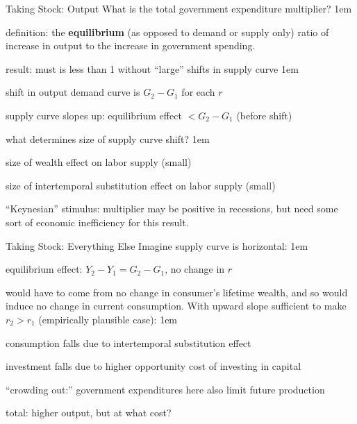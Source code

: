 \documentclass[11pt,aspectratio=43]{beamer}
\let\olditemize=\itemize
\let\endolditemize=\enditemize
\renewenvironment{itemize}{\olditemize \itemsep1em}{\endolditemize}
\theoremstyle{definition}
\begin{document}
\begin{frame}{Taking Stock: Output}
\label{slide:Taking_Stock__Output}
    What is the \alert{total government expenditure multiplier}?
    \begin{itemize}
        \item \alert{definition}: the \textbf{equilibrium} (as opposed to demand or supply only) ratio of increase in output to the increase in government spending.
        \item \alert{result:} must is less than 1 without ``large'' shifts in supply curve
        \begin{itemize}
            \item  shift in output demand curve is $ G_{2} - G_{1} $ for each $ r $
            \item supply curve slopes up: equilibrium effect $ < G_{2} - G_{1} $ (before shift)
            \item what determines size of supply curve shift?
            \begin{itemize}
                \item size of wealth effect on labor supply (small)
                \item size of intertemporal substitution effect on labor supply (small)
            \end{itemize}
            \item ``Keynesian'' stimulus: multiplier may be positive in recessions, but need some sort of economic inefficiency for this result.
        \end{itemize}
    \end{itemize}
\end{frame}

\begin{frame}{Taking Stock: Everything Else}
\label{slide:Taking_Stock__Everything_Else}
    Imagine supply curve is horizontal:
    \begin{itemize}
        \item equilibrium effect: $ Y_{2} - Y_{1} = G_{2} - G_{1} $, no change in $ r $
        \item would have to come from no change in consumer’s lifetime wealth, and so would induce no change in current consumption.
    \end{itemize}
    With upward slope sufficient to make $ r_{2} > r_{1} $ (empirically plausible case):
    \begin{itemize}
        \item consumption falls due to intertemporal substitution effect
        \item investment falls due to higher opportunity cost of investing in capital
        \item ``crowding out:'' government expenditures here also limit future production
        \item total: higher output, but at what cost?
    \end{itemize}
\end{frame}
\end{document}
